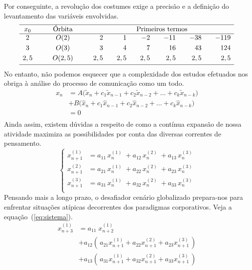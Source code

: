 \documentclass[fleqn]{profmat-cefet}
\begin{document}
Por conseguinte, a revolução dos costumes exige a precisão e a
definição do levantamento das variáveis envolvidas. 
\[
\begin{array}{ccrrrrrr}     \hline
x_0  &
{\qquad \text{Órbita} \qquad} &
\multicolumn{6}{c}{\text{Primeiros termos}} \\ \hline 
2   & O(2  )  &   2 &\quad   1 &\quad   -2 &\quad  -11 &\quad  -38 &\quad -119 \quad  \\[1mm]
3   & O(3  )  &   3 &\quad   4 &\quad    7 &\quad   16 &\quad   43 &\quad  124 \quad  \\[1mm]
2,5 & O(2,5)  & 2,5 &\quad 2,5 &\quad  2,5 &\quad  2,5 &\quad  2,5 &\quad  2,5 \quad  \\[1mm] \hline
\end{array}
\]
No entanto, não podemos esquecer que a complexidade dos estudos efetuados nos
obriga à análise do processo de comunicação como um todo.
\[
\begin{split}
x_n & = A \big( \tilde{x}_n + c_1\tilde{x}_{n-1} + c_2\tilde{x}_{n-2} + \dots + c_k\tilde{x}_{n-k} \big) \\
& + B \big(   \hat{x}_n + c_1  \hat{x}_{n-1} + c_2  \hat{x}_{n-2} + \dots + c_k  \hat{x}_{n-k} \big) \\
& = 0 \\
\end{split}
\]
Ainda assim, existem dúvidas a respeito de como a contínua expansão de nossa
atividade maximiza as possibilidades por conta das diversas correntes de
pensamento.
\begin{equation}
    \label{eq:sistema}
    \left\{
    \begin{split}
        x_{n+1}^{(1)} & = a_{11}\, x_{n}^{(1)} \; + a_{12}\, x_{n}^{(2)} \; + a_{13}\, x_{n}^{(3)} \\[2mm]
        x_{n+1}^{(2)} & = a_{21}\, x_{n}^{(1)} \; + a_{22}\, x_{n}^{(2)} \; + a_{23}\, x_{n}^{(3)} \\[2mm]
        x_{n+1}^{(3)} & = a_{31}\, x_{n}^{(1)} \; + a_{32}\, x_{n}^{(2)} \; + a_{33}\, x_{n}^{(3)} \\
    \end{split}
\right.
\end{equation}
Pensando mais a longo prazo, o desafiador cenário globalizado prepara-nos para
enfrentar situações atípicas decorrentes dos paradigmas corporativos. 
Veja a equação~(\ref{eq:sistema}).
\begin{equation}
\begin{split}
        x_{n+3}^{(1)} & = a_{11}\; x_{n+2}^{(1)}                                                                  \\[2mm]
                      & + a_{12} \left( \, a_{21}x_{n+1}^{(1)}+a_{22}x_{n+1}^{(2)}+a_{23}x_{n+1}^{(3)} \, \right) \\[2mm]
                      & + a_{13} \left( \, a_{31}x_{n+1}^{(1)}+a_{32}x_{n+1}^{(2)}+a_{33}x_{n+1}^{(3)} \, \right)
\end{split}
\end{equation}
\end{document}
